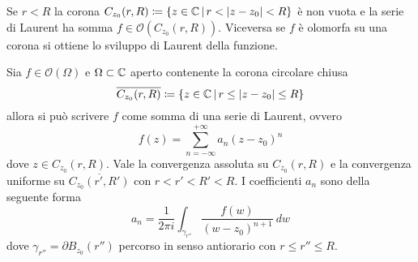 \begin{remark}
  Se $r < R$ la corona $C_{z_0}(r,R) \coloneqq \left\{ z \in \mathbb{C} \,\middle|\,
  r < |z - z_0|  < R \right\}$ è non vuota e la serie di Laurent ha somma $f \in
  \mathcal{O}(C_{z_0}(r,R))$. Viceversa se $f$ è olomorfa su una corona si
  ottiene lo sviluppo di Laurent della funzione.
  \label{rmk:reverso_card_holo_func}
\end{remark}

\begin{theorem}
  Sia $f \in \mathcal{O}(\Omega)$ e $\Omega \subset \mathbb{C}$ aperto contenente la
  corona circolare chiusa 
  \begin{equation*}
    \overline{C_{z_0}(r,R)} \coloneqq \left\{ z \in \mathbb{C} \,\middle|\,
            r \le |z - z_0| \le R \right\}
  \end{equation*}
  allora si può scrivere $f$ come somma di una serie di Laurent, ovvero 
  \begin{equation*}
    f(z) = \sum_{n = -\infty}^{+\infty} a_n(z-z_0)^n
  \end{equation*}
  dove $z \in C_{z_0}(r,R)$. Vale la convergenza assoluta su $C_{z_0}(r,R)$ e la
  convergenza uniforme su $\overline{C_{z_0}(r',R')}$ con $r < r' < R' < R$.
  I coefficienti $a_n$ sono della seguente forma 
  \begin{equation*}
    a_n = \frac{1}{2\pi i} \int_{\gamma_{r''}} \frac{f(w)}{(w-z_0)^{n+1}}\ dw
  \end{equation*}
  dove $\gamma_{r''} = \partial B_{z_0}(r'')$ percorso in senso antiorario con
  $r \le r'' \le R$.
  \label{thr:function_as_laurent_series}
\end{theorem}
